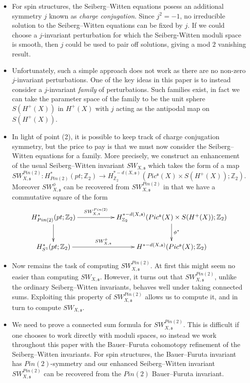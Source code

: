 \documentclass{amsart}
\theoremstyle{definition}
\theoremstyle{remark}
\numberwithin{equation}{section}
\begin{document}
\begin{itemize}
\item[(1)]{For spin structures, the Seiberg--Witten equations posess an additional symmetry $j$ known as {\em charge conjugation}. Since $j^2 = -1$, no irreducible solution to the Seiberg--Witten equations can be fixed by $j$. If we could choose a $j$-invariant perturbation for which the Seiberg-Witten moduli space is smooth, then $j$ could be used to pair off solutions, giving a mod $2$ vanishing result.}
\item[(2)]{Unfortunately, such a simple approach does not work as there are no non-zero $j$-invariant perturbations. One of the key ideas in this paper is to instead consider a $j$-invariant {\em family} of perturbations. Such families exist, in fact we can take the parameter space of the family to be the unit sphere $S(H^+(X))$ in $H^+(X)$ with $j$ acting as the antipodal map on $S(H^+(X))$.}
\item[(3)]{In light of point (2), it is possible to keep track of charge conjugation symmetry, but the price to pay is that we must now consider the Seiberg--Witten equations for a family. More precisely, we construct an enhancement of the usual Seiberg--Witten invariant  $SW_{X,\mathfrak{s}}$ which takes the form of a map
\[
SW_{X,\mathfrak{s}}^{Pin(2)} : H^*_{Pin(2)}(pt ; \mathbb{Z}_2) \to H_{\mathbb{Z}_2}^{*-d(X,\mathfrak{s})}( Pic^{\mathfrak{s}}(X) \times S(H^+(X)) ; \mathbb{Z}_2).
\]
Moreover $SW_{X,\mathfrak{s}}^\phi$ can be recovered from $SW_{X,\mathfrak{s}}^{Pin(2)}$ in that we have a commutative square of the form
\[
\xymatrix{
H^*_{Pin(2)}(pt ; \mathbb{Z}_2) \ar[rr]^-{SW^{Pin(2)}_{X,\mathfrak{s}}} \ar[d] & & H^{*-d(X,\mathfrak{s})}_{\mathbb{Z}_2}( Pic^{\mathfrak{s}}(X) \times S(H^+(X)) ; \mathbb{Z}_2) \ar[d]^-{\phi^*} \\
H^*_{S^1}(pt ; \mathbb{Z}_2) \ar[rr]^-{SW^\phi_{X,\mathfrak{s}}} & & H^{*-d(X,\mathfrak{s})}( Pic^{\mathfrak{s}}(X) ; \mathbb{Z}_2) \\
}
\]
}
\item[(4)]{Now remains the task of computing $SW_{X,\mathfrak{s}}^{Pin(2)}$. At first this might seem no easier than computing $SW_{X,\mathfrak{s}}$. However, it turns out that $SW_{X,\mathfrak{s}}^{Pin(2)}$, unlike the ordinary Seiberg--Witten invariants, behaves well under taking connected sums. Exploiting this property of $SW_{X,\mathfrak{s}}^{Pin(2)}$ allows us to compute it, and in turn to compute $SW_{X,\mathfrak{s}}$.}
\item[(5)]{We need to prove a connected sum formula for $SW_{X,\mathfrak{s}}^{Pin(2)}$. This is difficult if one chooses to work directly with moduli spaces, so instead we work throughout this paper with the Bauer--Furuta cohomotopy refinement of the Seiberg--Witten invariants. For spin structures, the Bauer--Furuta invariant has $Pin(2)$-symmetry and our enhanced Seiberg--Witten invariant $SW_{X,\mathfrak{s}}^{Pin(2)}$ can be recovered from the $Pin(2)$ Bauer--Furuta invariant.}

\end{itemize}
\end{document}
